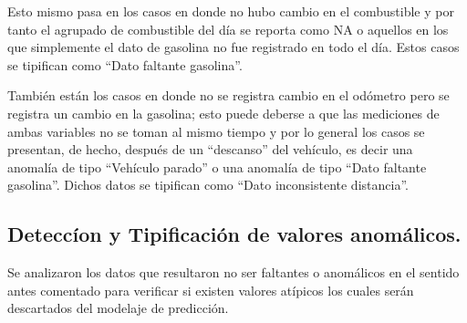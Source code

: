 \documentclass[]{article}
\newenvironment{Shaded}{\begin{snugshade}}{\end{snugshade}}
\newcommand{\KeywordTok}[1]{\textcolor[rgb]{0.13,0.29,0.53}{\textbf{#1}}}
\newcommand{\DecValTok}[1]{\textcolor[rgb]{0.00,0.00,0.81}{#1}}
\newcommand{\StringTok}[1]{\textcolor[rgb]{0.31,0.60,0.02}{#1}}
\newcommand{\CommentTok}[1]{\textcolor[rgb]{0.56,0.35,0.01}{\textit{#1}}}
\newcommand{\OperatorTok}[1]{\textcolor[rgb]{0.81,0.36,0.00}{\textbf{#1}}}
\newcommand{\NormalTok}[1]{#1}
\begin{document}
Esto mismo pasa en los casos en donde no hubo cambio en el combustible y
por tanto el agrupado de combustible del día se reporta como NA o
aquellos en los que simplemente el dato de gasolina no fue registrado en
todo el día. Estos casos se tipifican como ``Dato faltante gasolina''.

También están los casos en donde no se registra cambio en el odómetro
pero se registra un cambio en la gasolina; esto puede deberse a que las
mediciones de ambas variables no se toman al mismo tiempo y por lo
general los casos se presentan, de hecho, después de un ``descanso'' del
vehículo, es decir una anomalía de tipo ``Vehículo parado'' o una
anomalía de tipo ``Dato faltante gasolina''. Dichos datos se tipifican
como ``Dato inconsistente distancia''.

\begin{Shaded}
\end{Shaded}

\subsection{Deteccíon y Tipificación de valores
anomálicos.}\label{deteccion-y-tipificacion-de-valores-anomalicos.}

Se analizaron los datos que resultaron no ser faltantes o anomálicos en
el sentido antes comentado para verificar si existen valores atípicos
los cuales serán descartados del modelaje de predicción.
\end{document}

